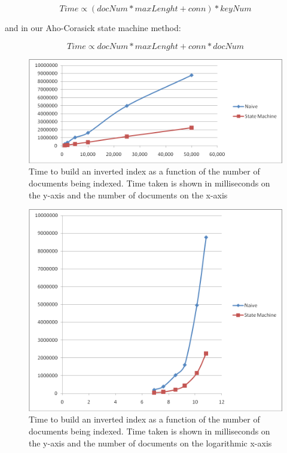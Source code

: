 \documentclass[10pt]{article}
\begin{document}
\[Time \propto (docNum * maxLenght + conn) * keyNum\]
 
and in our Aho-Corasick state machine method: 

\[Time \propto docNum * maxLenght + conn * docNum\]


\begin{figure}[p]
  \begin{center}
    \includegraphics[width=\textwidth,height=!]{naivesizecorpus}
  \end{center}
  \caption{Time to build an inverted index as a function of the
      number of documents being indexed. Time taken is shown in
      milliseconds on the y-axis and the number of documents on the
      x-axis} 
  \label{fig:naivesizecorpus}
\end{figure} 


\begin{figure}[p]
  \begin{center}
    \includegraphics[width=\textwidth,height=!]{naivesizecorpuslog}
  \end{center}
  \caption{Time to build an inverted index as a function of the
      number of documents being indexed. Time taken is shown in
      milliseconds on the y-axis and the number of documents on the
      logarithmic x-axis} 
  \label{fig:naivesizecorpuslog}
\end{figure} 
\end{document}
